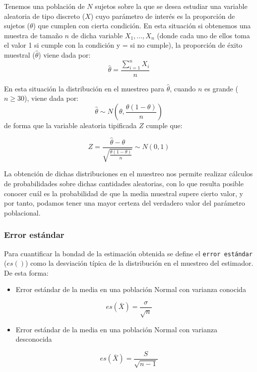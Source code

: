 \documentclass[
]{book}
\providecommand{\tightlist}{%
  \setlength{\itemsep}{0pt}\setlength{\parskip}{0pt}}
\begin{document}
Tenemos una población de \(N\) sujetos sobre la que se desea estudiar una variable aleatoria de tipo discreto (\(X\)) cuyo parámetro de interés es la proporción de sujetos (\(\theta\)) que cumplen con cierta condición. En esta situación si obtenemos una muestra de tamaño \(n\) de dicha variable \(X_1,...,X_n\) (donde cada uno de ellos toma el valor 1 si cumple con la condición y = si no cumple), la proporción de éxito muestral (\(\hat{\theta}\)) viene dada por: \[\hat{\theta} = \frac{\sum_{i=1}^n X_i}{n}\]

En esta situación la distribución en el muestreo para \(\hat{\theta}\), cuando \(n\) es grande (\(n \geq 30\)), viene dada por: \[\hat{\theta} \sim N \left(\theta, \frac{\theta (1-\theta)}{n}\right) \] de forma que la variable aleatoria tipificada \(Z\) cumple que:

\[Z = \frac{\hat{\theta}-\theta}{\sqrt{\frac{\theta (1-\theta)}{n}}} \sim N(0,1)\]

La obtención de dichas distribuciones en el muestreo nos permite realizar cálculos de probabilidades sobre dichas cantidades aleatorias, con lo que resulta posible conocer cuál es la probabilidad de que la media muestral supere cierto valor, y por tanto, podamos tener una mayor certeza del verdadero valor del parámetro poblacional.

\hypertarget{error-estuxe1ndar}{%
\subsubsection{Error estándar}\label{error-estuxe1ndar}}

Para cuantificar la bondad de la estimación obtenida se define el \texttt{error\ estándar} (\(es()\)) como la desviación típica de la distribución en el muestreo del estimador. De esta forma:

\begin{itemize}
\tightlist
\item
  Error estándar de la media en una población Normal con varianza conocida
\end{itemize}

\[es(\bar X) = \frac{\sigma}{\sqrt n}\]

\begin{itemize}
\tightlist
\item
  Error estándar de la media en una población Normal con varianza desconocida
\end{itemize}

\[es(\bar X) = \frac{S}{\sqrt{n-1}}\]
\end{document}
